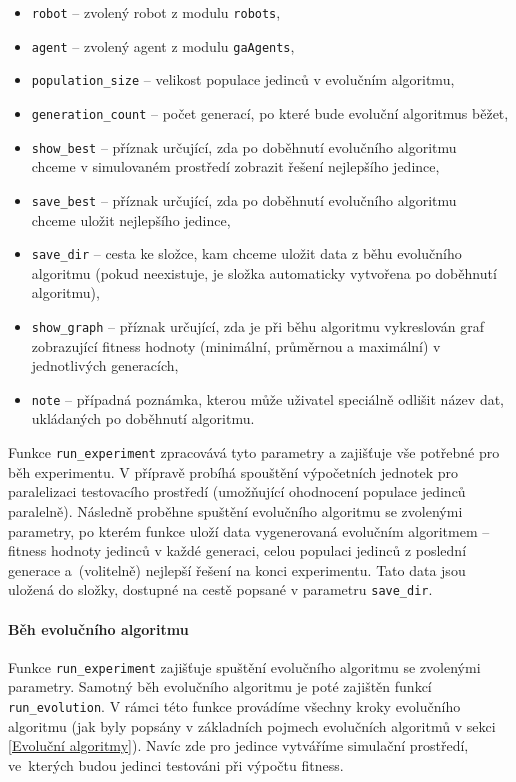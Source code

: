 \begin{itemize}
    \item \texttt{robot} -- zvolený robot z modulu \texttt{robots},
    \item \texttt{agent} -- zvolený agent z modulu \texttt{gaAgents},
    \item \texttt{population\_size} -- velikost populace jedinců v
        evolučním algoritmu,
    \item \texttt{generation\_count} -- počet generací, po které bude
        evoluční algoritmus běžet,
    \item \texttt{show\_best} -- příznak určující, zda po doběhnutí evolučního
        algoritmu \\chceme v simulovaném prostředí zobrazit řešení nejlepšího
        jedince,
    \item \texttt{save\_best} -- příznak určující, zda po doběhnutí evolučního
        algoritmu \\chceme uložit nejlepšího jedince,
    \item \texttt{save\_dir} -- cesta ke složce, kam chceme uložit data z běhu
        evolučního algoritmu (pokud neexistuje, je složka automaticky vytvořena
        po doběhnutí algoritmu),
    \item \texttt{show\_graph} -- příznak určující, zda je při běhu algoritmu
        vykreslován graf zobrazující fitness hodnoty (minimální, průměrnou a
        maximální) v jednotlivých generacích,
    \item \texttt{note} -- případná poznámka, kterou může uživatel speciálně
        odlišit název dat, ukládaných po doběhnutí algoritmu.
\end{itemize}

Funkce \texttt{run\_experiment} zpracovává tyto parametry a zajišťuje vše
potřebné pro běh experimentu. V přípravě probíhá spouštění výpočetních
jednotek pro paralelizaci testovacího prostředí (umožňující ohodnocení
populace jedinců paralelně). Následně proběhne spuštění evolučního algoritmu se
zvolenými parametry, po kterém funkce uloží data vygenerovaná evolučním
algoritmem -- fitness hodnoty jedinců v každé generaci, celou
populaci jedinců z poslední generace a~(volitelně) nejlepší řešení na konci
experimentu. Tato data jsou uložená do složky, dostupné na cestě popsané v
parametru \texttt{save\_dir}.

\paragraph{Běh evolučního algoritmu}
Funkce \texttt{run\_experiment} zajišťuje spuštění evolučního algoritmu se
zvolenými parametry. Samotný běh evolučního algoritmu je poté zajištěn funkcí
\texttt{run\_evolution}. V rámci této funkce provádíme všechny kroky evolučního
algoritmu (jak byly popsány v základních pojmech evolučních algoritmů v sekci
\ref{Evoluční algoritmy}). Navíc zde pro jedince vytváříme simulační prostředí,
ve~kterých budou jedinci testováni při výpočtu fitness.

